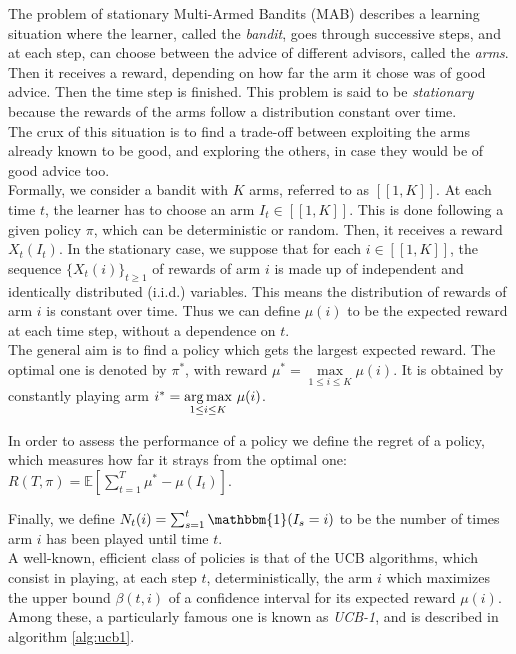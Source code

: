 The problem of stationary Multi-Armed Bandits (MAB) describes a learning situation where the learner, called the \textit{bandit}, goes through successive steps, and at each step, can choose between the advice of different advisors, called the \textit{arms}. Then it receives a reward, depending on how far the arm it chose was of good advice. Then the time step is finished. This problem is said to be \textit{stationary} because the rewards of the arms follow a distribution constant over time.\\
The crux of this situation is to find a trade-off between exploiting the arms already known to be good, and exploring the others, in case they would be of good advice too.\\

Formally, we consider a bandit with $K$ arms, referred to as $[\![1,K]\!]$. At each time $t$, the learner has to choose an arm $I_t \in [\![1,K]\!]$. This is done following a given policy $\pi$, which can be deterministic or random. Then, it receives a reward $X_t(I_t)$. In the stationary case, we suppose that for each $i \in [\![1,K]\!]$, the sequence $\{X_t(i)\}_{t \geq 1}$ of rewards of arm $i$ is made up of independent and identically distributed (i.i.d.) variables. This means the distribution of rewards of arm $i$ is constant over time. Thus we can define $\mu(i)$ to be the expected reward at each time step, without a dependence on $t$.\\

The general aim is to find a policy which gets the largest expected reward. The optimal one is denoted by $\pi^*$, with reward $\mu^*=\underset{1\leq i \leq K}{\max} \mu(i)$. It is obtained by constantly playing arm $i^* = \underset{1\leq i \leq K}{\operatorname*{arg\,max}}\ \mu(i)$.

In order to assess the performance of a policy we define the regret of a policy, which measures how far it strays from the optimal one: $R(T,\pi)=\mathbb{E}\left[\sum_{t=1}^T \mu^* - \mu(I_t) \right]$.

Finally, we define $N_t(i)=\sum_{s=1}^t \mathbbm{1}(I_s=i)$ to be the number of times arm $i$ has been played until time $t$.\\

A well-known, efficient class of policies is that of the UCB	algorithms, which consist in playing, at each step $t$, deterministically, the arm $i$ which maximizes the upper bound $\beta(t,i)$ of a confidence interval for its expected reward $\mu(i)$.\\
Among these, a particularly famous one is known as \textit{UCB-1}, and is described in algorithm \ref{alg:ucb1}.

